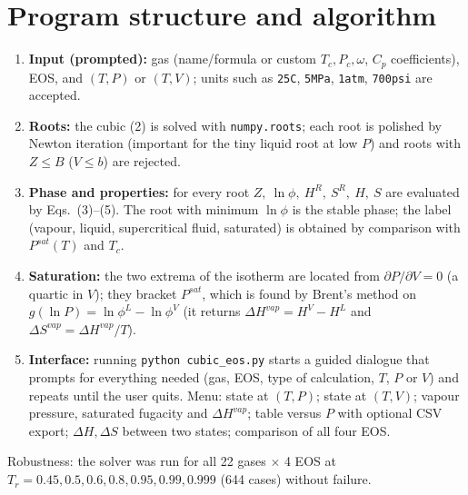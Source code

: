 \documentclass[10pt,a4paper]{article}
\begin{document}
\section{Program structure and algorithm}
\begin{enumerate}
\item \textbf{Input (prompted):} gas (name/formula or custom $T_c,P_c,\omega$, $C_p$ coefficients), EOS, and $(T,P)$ or $(T,V)$; units such as \texttt{25C}, \texttt{5MPa}, \texttt{1atm}, \texttt{700psi} are accepted.
\item \textbf{Roots:} the cubic (2) is solved with \texttt{numpy.roots}; each root is polished by Newton iteration (important for the tiny liquid root at low $P$) and roots with $Z\le B$ ($V\le b$) are rejected.
\item \textbf{Phase and properties:} for every root $Z,\ \ln\phi,\ H^R,\ S^R,\ H,\ S$ are evaluated by Eqs.~(3)--(5). The root with minimum $\ln\phi$ is the stable phase; the label (vapour, liquid, supercritical fluid, saturated) is obtained by comparison with $P^{sat}(T)$ and $T_c$.
\item \textbf{Saturation:} the two extrema of the isotherm are located from $\partial P/\partial V=0$ (a quartic in $V$); they bracket $P^{sat}$, which is found by Brent's method on $g(\ln P)=\ln\phi^L-\ln\phi^V$ (it returns $\Delta H^{vap}=H^V-H^L$ and $\Delta S^{vap}=\Delta H^{vap}/T$).
\item \textbf{Interface:} running \texttt{python cubic\_eos.py} starts a guided dialogue that prompts for everything needed (gas, EOS, type of calculation, $T$, $P$ or $V$) and repeats until the user quits. Menu: state at $(T,P)$; state at $(T,V)$; vapour pressure, saturated fugacity and $\Delta H^{vap}$; table versus $P$ with optional CSV export; $\Delta H,\Delta S$ between two states; comparison of all four EOS.
\end{enumerate}
Robustness: the solver was run for all 22 gases $\times$ 4 EOS at $T_r=0.45,0.5,0.6,0.8,0.95,0.99,0.999$ (644 cases) without failure.
\end{document}
